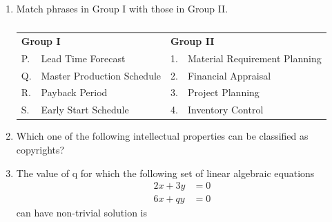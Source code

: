\documentclass[journal,12pt,onecolumn]{IEEEtran}
\theoremstyle{remark}
\begin{document}
\begin{enumerate}
\item Match phrases in Group I with those in Group II.
\begin{table}[H]
\caption*{}
\label{tab:q15}
\centering
\begin{tabular}{llcl}
\multicolumn{2}{l}{\textbf{Group I}} & \multicolumn{2}{l}{\textbf{Group II}} \\
P. & Lead Time Forecast & 1. & Material Requirement Planning \\
Q. & Master Production Schedule & 2. & Financial Appraisal \\
R. & Payback Period & 3. & Project Planning \\
S. & Early Start Schedule & 4. & Inventory Control \\
\end{tabular}
\end{table}
\hfill{}
\begin{enumerate}
\end{enumerate}

\item Which one of the following intellectual properties can be classified as copyrights?
\hfill{}
\begin{enumerate}
\end{enumerate}

\item The value of q for which the following set of linear algebraic equations
\begin{align*}
2x + 3y &= 0 \\
6x + qy &= 0
\end{align*}
can have non-trivial solution is
\hfill{}
\begin{enumerate}
\end{enumerate}


\end{enumerate}
\end{document}
